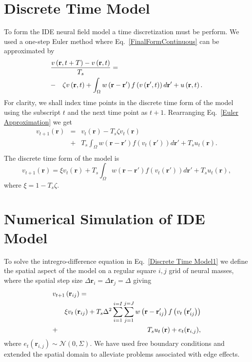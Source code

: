 \documentclass[twocolumn,11pt,a4paper]{article}		%
\begin{document}
\section{Discrete Time Model}\label{Time Discretization} To form the IDE neural field model a time discretization must be perform. We used a one-step Euler method where Eq.~\ref{FinalFormContinuous} can be approximated by 
\begin{eqnarray}
	\label{Euler Approximation} \lefteqn{\frac{v\left( \mathbf{r},t+T \right) - v\left( \mathbf{r},t\right)}{T_s} =}\nonumber\\
& -&\zeta v\left( \mathbf{r},t \right) + \int_\Omega {w\left( \mathbf{r}-\mathbf{r}' \right)f\left( {v\left( \mathbf{r}',t \right)} \right)d\mathbf{r}'} + u\left(\mathbf{r},t\right).\nonumber \\ 
\end{eqnarray}
For clarity, we shall index time points in the discrete time form of the model using the subscript $t$ and the next time point as $t+1$. Rearranging Eq.~\ref{Euler Approximation} we get 
\begin{eqnarray}
	\label{Euler Approximation2} v_{t+1}\left( \mathbf{r}\right) &=& v_t\left( \mathbf{r}\right) -T_s \zeta v_t\left( \mathbf{r}\right)\nonumber \\
&+& T_s \int_\Omega {w\left( \mathbf{r}-\mathbf{r}' \right)f\left( {v_t\left( \mathbf{r}'\right)} \right)d\mathbf{r}'} + T_s u_t\left(\mathbf{r}\right).\nonumber \\ 
\end{eqnarray}
The discrete time form of the model is 
\begin{equation}
	\label{Discrete Time Model1} v_{t+1}\left(\mathbf{r}\right) = \xi v_t\left(\mathbf{r}\right) + T_s \int_\Omega { w\left(\mathbf{r}-\mathbf{r}'\right) f\left(v_t\left(\mathbf{r}'\right)\right) d\mathbf{r}'} + T_s u_t\left(\mathbf{r}\right), 
\end{equation}
where $\xi = 1 - T_s \zeta$. 
\section{Numerical Simulation of IDE Model}\label{Space Discretization} To solve the intregro-difference equation in Eq.~\ref{Discrete Time Model1} we define the spatial aspect of the model on a regular square $i,j$ grid of neural masses, where the spatial step size $\Delta \mathbf{r}_i = \Delta \mathbf{r}_j = \Delta $ giving 
\begin{eqnarray}
	\label{discrete space} \lefteqn{v_{t+1}\left(\mathbf{r}_{ij}\right)=}\nonumber\\
&&\xi v_t\left(\mathbf{r}_{ij}\right)+T_s \Delta^2\sum_{i=1}^{i=I}{\sum_{j=1}^{j=J}{w\left(\mathbf{r}-\mathbf{r}_{ij}'\right)f\left( v_t\left( \mathbf{r}_{ij}'\right)\right)}}\nonumber\\
&+& T_s u_t\left(\mathbf{r}\right) + e_t(\mathbf{r}_{i,j}), 
\end{eqnarray}
where $e_t(\mathbf{r}_{i,j}) \sim \mathcal{N}\left(0,\Sigma\right)$. We have used free boundary conditions and extended the spatial domain to alleviate problems associated with edge effects. 
\end{document}
